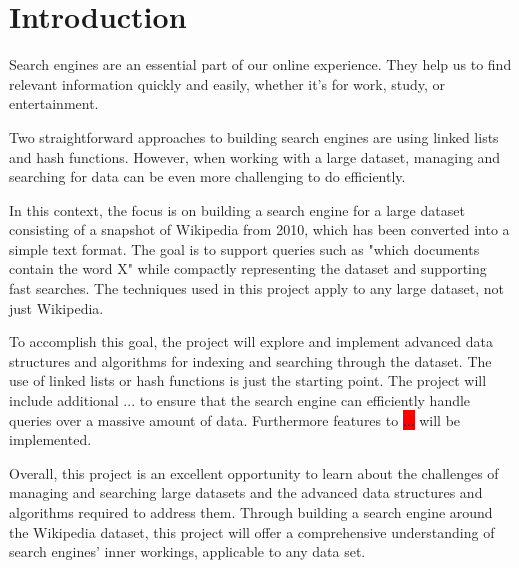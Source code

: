 \chapter{Introduction}
Search engines are an essential part of our online experience. They help us to find relevant information quickly and easily, whether it's for work, study, or entertainment. 

Two straightforward approaches to building search engines are using linked lists and hash functions. However, when working with a large dataset, managing and searching for data can be even more challenging to do efficiently. 

In this context, the focus is on building a search engine for a large dataset consisting of a snapshot of Wikipedia from 2010, which has been converted into a simple text format. The goal is to support queries such as "which documents contain the word X" while compactly representing the dataset and supporting fast searches. The techniques used in this project apply to any large dataset, not just Wikipedia.

To accomplish this goal, the project will explore and implement advanced data structures and algorithms for indexing and searching through the dataset. The use of linked lists or hash functions is just the starting point. The project will include additional ... to ensure that the search engine can efficiently handle queries over a massive amount of data. Furthermore features to \colorbox{red}{...} will be implemented. 

Overall, this project is an excellent opportunity to learn about the challenges of managing and searching large datasets and the advanced data structures and algorithms required to address them. Through building a search engine around the Wikipedia dataset, this project will offer a comprehensive understanding of search engines' inner workings, applicable to any data set.
